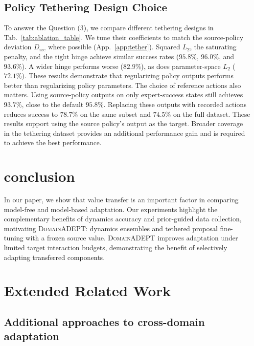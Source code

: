 \documentclass{article} %
\newcommand{\DomainADEPT}{\textsc{DomainADEPT}\xspace}
\begin{document}
\subsection{Policy Tethering Design Choice}

To answer the Question (3), we compare different tethering designs in Tab.~\ref{tab:ablation_table}. We tune their coefficients to match the source-policy deviation $D_{\mathrm{src}}$ where possible (App.~\ref{app:tether}). Squared $L_2$, the saturating penalty, and the tight hinge achieve similar success rates ($95.8\%$, $96.0\%$, and $93.6\%$). A wider hinge performs worse ($82.9\%$), as does parameter-space $L_2$ ($72.1\%$). These results demonstrate that regularizing policy outputs performs better than regularizing policy parameters.
%
The choice of reference actions also matters. Using source-policy outputs on only expert-success states still achieves $93.7\%$, close to the default $95.8\%$. Replacing these outputs with recorded actions reduces success to $78.7\%$ on the same subset and $74.5\%$ on the full dataset. These results support using the source policy's output as the target. Broader coverage in the tethering dataset provides an additional performance gain and is required to achieve the best performance.


\section{conclusion}
\label{sec:conclusion}

In our paper, we show that value transfer is an important factor in comparing model-free and model-based adaptation. Our experiments highlight the complementary benefits of dynamics accuracy and prior-guided data collection, motivating \DomainADEPT: dynamics ensembles and tethered proposal fine-tuning with a frozen source value. \DomainADEPT improves adaptation under limited target interaction budgets, demonstrating the benefit of selectively adapting transferred components.




\newpage

\appendix

\section{Extended Related Work}
\label{app:extended-rw}

\subsection{Additional approaches to cross-domain adaptation}
\end{document}
